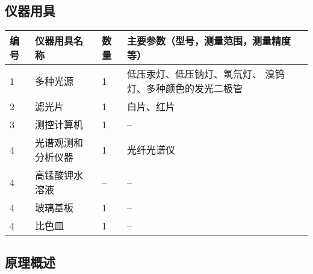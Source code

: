 \documentclass[dvipsnames, svgnames,a4paper,11pt]{article}
\begin{document}
	\subsection{仪器用具}
	\begin{table}[htbp]
		\centering
		\renewcommand\arraystretch{1.6}
		\begin{tabular}{p{}|p{}|p{}|p{}}
			\hline
			编号& 仪器用具名称 & 数量 &  主要参数（型号，测量范围，测量精度等） \\
			\hline
			1& 多种光源 & 1 & 低压汞灯、低压钠灯、氢氘灯、 溴钨灯、多种颜色的发光二极管 \\
			\hline
			2& 滤光片 & 1 & 白片、红片 \\
			\hline
			3& 测控计算机 & 1 & -- \\
			\hline
			4& 光谱观测和分析仪器 & 1 & 光纤光谱仪 \\
			\hline
			4& 高锰酸钾水溶液 & -- & -- \\
			\hline
			4& 玻璃基板 & 1 & -- \\
			\hline
			4& 比色皿 & 1 & -- \\
			\hline
		\end{tabular}
	\end{table}
	
	\subsection{原理概述}
	
\end{document}
